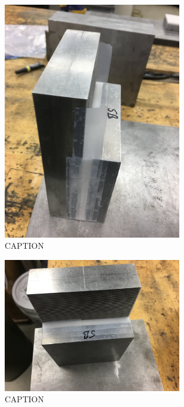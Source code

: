 \begin{figure}
	\centering
        \includegraphics[width=0.7\textwidth]{appendix_sample_prep/dds_standup_one_block.jpg}
   	\caption{CAPTION}
  	\label{Fig:dds_standup_one_block}
\end{figure}

\begin{figure}
	\centering
        \includegraphics[width=0.7\textwidth]{appendix_sample_prep/dds_one_block_taped.jpg}
   	\caption{CAPTION}
  	\label{Fig:dds_one_block_taped}
\end{figure}

